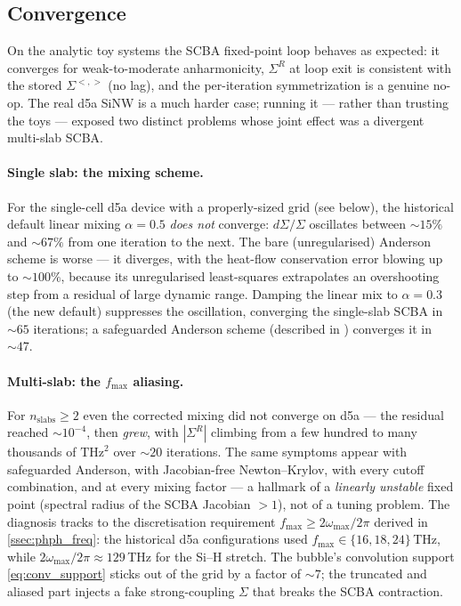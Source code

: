 \subsection{Convergence}
\label{ssec:solver_convergence}

On the analytic toy systems the SCBA fixed-point loop behaves as
expected: it converges for weak-to-moderate anharmonicity, $\Sigma^{R}$
at loop exit is consistent with the stored $\Sigma^{<,>}$ (no lag), and
the per-iteration symmetrization is a genuine no-op. The real d5a SiNW
is a much harder case; running it --- rather than trusting the toys
--- exposed two distinct problems whose joint effect was a divergent
multi-slab SCBA.

\paragraph{Single slab: the mixing scheme.}
For the single-cell d5a device with a properly-sized grid (see below),
the historical default linear mixing $\alpha=0.5$ \emph{does not}
converge: $d\Sigma/\Sigma$ oscillates between $\sim15\%$ and $\sim67\%$
from one iteration to the next. The bare (unregularised) Anderson
scheme is worse --- it diverges, with the heat-flow conservation
error blowing up to $\sim100\%$, because its unregularised least-squares
extrapolates an overshooting step from a residual of large dynamic
range. Damping the linear mix to $\alpha=0.3$ (the new default)
suppresses the oscillation, converging the single-slab SCBA in
${\sim}65$ iterations; a safeguarded Anderson scheme (described in
) converges it in ${\sim}47$.

\paragraph{Multi-slab: the $f_{\max}$ aliasing.}
For $n_\mathrm{slabs}\ge 2$ even the corrected mixing did not converge
on d5a --- the residual reached $\sim10^{-4}$, then \emph{grew}, with
$|\Sigma^{R}|$ climbing from a few hundred to many thousands of
$\mathrm{THz}^{2}$ over $\sim 20$ iterations. The same symptoms appear
with safeguarded Anderson, with Jacobian-free
Newton--Krylov, with every cutoff combination, and at every mixing
factor --- a hallmark of a \emph{linearly unstable} fixed point
(spectral radius of the SCBA Jacobian $>1$), not of a tuning problem.
The diagnosis tracks to the discretisation requirement
$f_{\max}\ge 2\omega_{\max}/2\pi$ derived in
\cref{ssec:phph_freq}: the historical d5a configurations used
$f_{\max}\in\{16,18,24\}$\,THz, while
$2\omega_{\max}/2\pi\approx 129$\,THz for the Si--H stretch. The
bubble's convolution support \cref{eq:conv_support} sticks out of the
grid by a factor of $\sim 7$; the truncated and aliased part injects a
fake strong-coupling $\Sigma$ that breaks the SCBA contraction.

